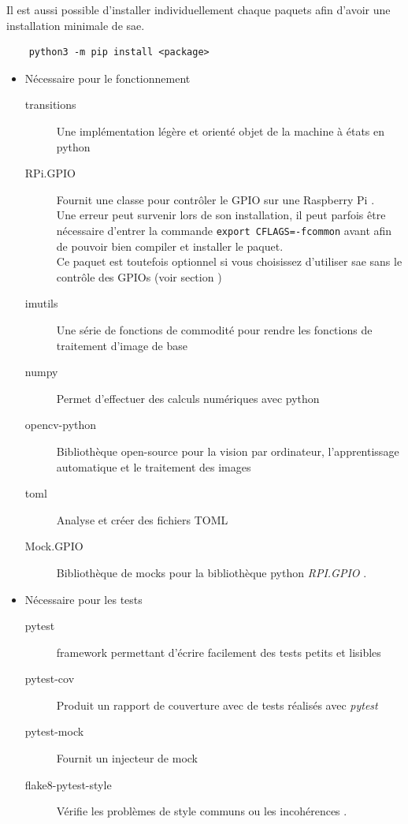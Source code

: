 Il est aussi possible d'installer individuellement chaque \glspl{paquet} afin d'avoir une installation minimale de \gls{sae}.

\begin{verbatim}
    python3 -m pip install <package>
\end{verbatim}

\begin{itemize}
    \item Nécessaire pour le fonctionnement
          \begin{description}
              \item[transitions] Une implémentation légère et orienté objet de la machine à états en \gls{python} \cite{transition}
              \item[RPi.GPIO] Fournit une classe pour contrôler le GPIO sur une Raspberry Pi \cite{rpi_gpio}.\\
                  Une erreur peut survenir lors de son installation, il peut parfois être nécessaire d'entrer la commande
                  \texttt{export CFLAGS=-fcommon} avant afin de pouvoir bien compiler et installer le \gls{paquet}.\\
                  Ce \gls{paquet} est toutefois optionnel si vous choisissez d'utiliser \gls{sae} sans le contrôle des GPIOs
                  (voir section )
              \item[imutils] Une série de fonctions de commodité pour rendre les fonctions de traitement d'image de
                  base \cite{imutils}
              \item[numpy] Permet d’effectuer des calculs numériques avec \gls{python} \cite{numpy}
              \item[opencv-python] Bibliothèque open-source pour la vision par ordinateur, l'apprentissage automatique
                  et le traitement des images \cite{opencv}
              \item[toml] Analyse et créer des fichiers TOML \cite{toml}
              \item[Mock.GPIO] Bibliothèque de \glspl{mock} pour la bibliothèque \gls{python} \textit{RPI.GPIO} \cite{mock_gpio}.
          \end{description}

    \item Nécessaire pour les tests
          \begin{description}
              \item[pytest] \Gls{framework} permettant d'écrire facilement des tests petits et lisibles \cite{pytest}
              \item[pytest-cov] Produit un rapport de couverture avec de tests réalisés avec \textit{pytest} \cite{pytest_cov}
              \item[pytest-mock] Fournit un injecteur de \gls{mock} \cite{pytest_mock}
              \item[flake8-pytest-style]
                  Vérifie les problèmes de style communs ou les incohérences \cite{flake8_pytest_style}.
          \end{description}


\end{itemize}
